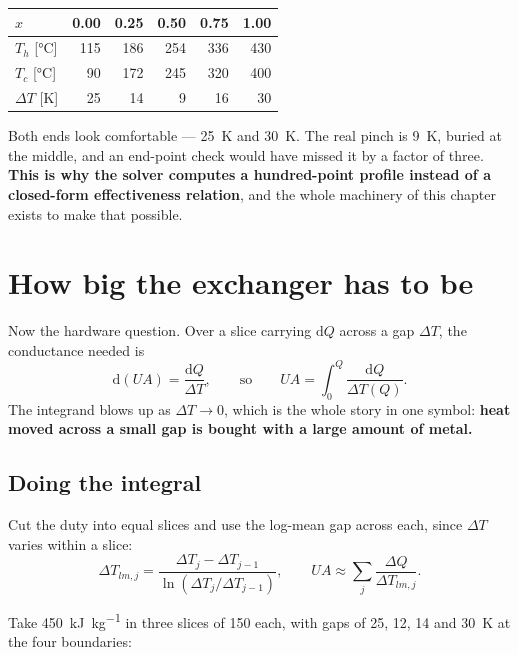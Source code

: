 \documentclass[11pt,a4paper]{report}
\begin{document}
\begin{center}
\begin{tabular}{@{}lrrrrr@{}}
\toprule
$x$                          & 0.00 & 0.25 & 0.50 & 0.75 & 1.00 \\
\midrule
$T_h$ [\si{\celsius}]        & 115  & 186  & 254  & 336  & 430 \\
$T_c$ [\si{\celsius}]        &  90  & 172  & 245  & 320  & 400 \\
$\Delta T$ [\si{\kelvin}]    &  25  &  14  &   9  &  16  &  30 \\
\bottomrule
\end{tabular}
\end{center}

Both ends look comfortable --- \SI{25}{\kelvin} and \SI{30}{\kelvin}. The
real pinch is \SI{9}{\kelvin}, buried at the middle, and an end-point check
would have missed it by a factor of three. \textbf{This is why the solver
computes a hundred-point profile instead of a closed-form effectiveness
relation}, and the whole machinery of this chapter exists to make that
possible.

\section{How big the exchanger has to be}
\label{sec:ua}

Now the hardware question. Over a slice carrying $\mathrm{d}Q$ across a gap
$\Delta T$, the conductance needed is
\begin{equation}
  \mathrm{d}(UA) = \frac{\mathrm{d}Q}{\Delta T},
  \qquad\text{so}\qquad
  UA = \int_0^Q \frac{\mathrm{d}Q}{\Delta T(Q)}.
  \label{eq:ua}
\end{equation}
The integrand blows up as $\Delta T \to 0$, which is the whole story in one
symbol: \textbf{heat moved across a small gap is bought with a large amount
of metal.}

\subsection{Doing the integral}

Cut the duty into equal slices and use the log-mean gap across each, since
$\Delta T$ varies within a slice:
\[
  \Delta T_{lm,j} = \frac{\Delta T_j - \Delta T_{j-1}}
                         {\ln\!\left(\Delta T_j / \Delta T_{j-1}\right)},
  \qquad
  UA \approx \sum_j \frac{\Delta Q}{\Delta T_{lm,j}}.
\]

Take \SI{450}{\kilo\joule\per\kilogram} in three slices of \SI{150}{} each,
with gaps of \SI{25}{}, \SI{12}{}, \SI{14}{} and \SI{30}{\kelvin} at the
four boundaries:
\end{document}
